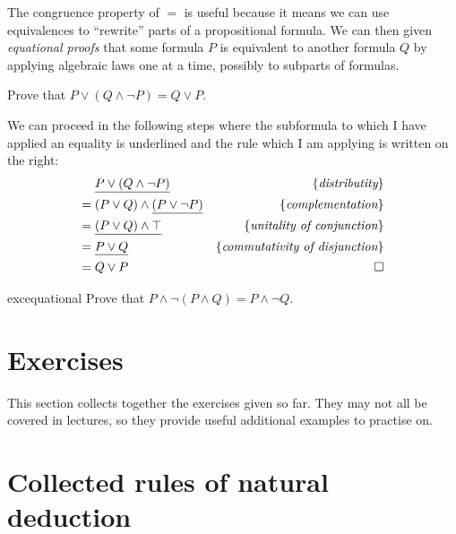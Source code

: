 The congruence property of $=$ is useful because it means we can use
equivalences to ``rewrite'' parts of a propositional formula.
We can then given \emph{equational proofs} that
some formula $P$ is equivalent to another formula $Q$
by applying  algebraic laws one at a time, possibly
to subparts of formulas.

\begin{example}
  Prove that $P \vee (Q \wedge \neg P) = Q \vee P$.

  We can proceed in the following steps where the subformula
  to which I have applied an equality is underlined and the rule
  which I am applying is written on the right:
  \begin{align*}
  & \underline{P \vee (Q \wedge \neg P)} & \{\textit{distributity}\} \\
= \; & (P \vee Q) \wedge \underline{(P \vee \neg P)}  & \{\textit{complementation}\}  \\
= \; & \underline{(P \vee Q) \wedge \top} &  \{\textit{unitality of conjunction}\} \\
= \; & \underline{P \vee Q} & \{\textit{commutativity of disjunction}\} \\
= \; & Q \vee P & \qquad \qed
\end{align*}
\end{example}

\begin{restatable}{exc}{equational}
Prove that $P \wedge \neg(P \wedge Q) = P \wedge \neg Q$.
\end{restatable}

\section{Exercises}

  This section collects together the exercises given so far. They may
  not all be covered in lectures, so they provide useful
  additional examples to practise on.

  \assoc*
  \andReproof*
  \implProperty*
  \kcombinator*
  \biimplRules*
  \orassoc*
  \disproveEx*
  \lemp*
  \unitality*
  \equational*

\section{Collected rules of natural deduction}

